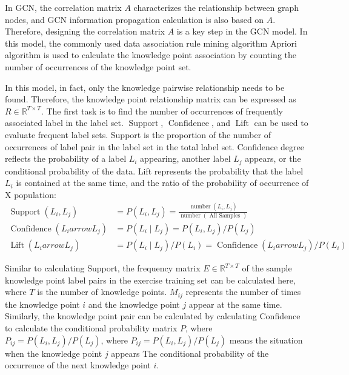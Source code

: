 In GCN, the correlation matrix \(A\) characterizes the relationship between graph nodes, and GCN information propagation calculation is also based on \(A\). Therefore, designing the correlation matrix \(A\) is a key step in the GCN model. In this model, the commonly used data association rule mining algorithm Apriori algorithm is used to calculate the knowledge point association by counting the number of occurrences of the knowledge point set.

In this model, in fact, only the knowledge pairwise relationship needs to be found. Therefore, the knowledge point relationship matrix can be expressed as \(R\in \mathbb{R}^{T\times T}\). The first task is to find the number of occurrences of frequently associated label in the label set. \(\operatorname{Support}\), \(\operatorname{Confidence}\), and \(\operatorname{Lift}\) can be used to evaluate frequent label sets. Support is the proportion of the number of occurrences of label pair in the label set in the total label set. Confidence degree reflects the probability of a label \(L_i\) appearing, another label \(L_j\) appears, or the conditional probability of the data. Lift represents the probability that the label \(L_i\) is contained at the same time, and the ratio of the probability of occurrence of X population:
\begin{align}
	\operatorname{Support}(L_i, L_j)         & =P(L_i,L_j)=\frac{\operatorname{number}(L_i,L_j)}{\operatorname{number}(\text { All Samples })} \\
	\operatorname{Confidence}(L_i arrow L_j) & =P(L_i \mid L_j)=P(L_i, L_j) / P(L_j)                                                           \\
	\operatorname{Lift}(L_i arrow L_j)       & =P(L_i \mid L_j) / P(L_i)=\operatorname{Confidence}(L_i arrow L_j) / P(L_i)
\end{align}

Similar to calculating Support, the frequency matrix \(E\in \mathbb{R}^{T\times T}\) of the sample knowledge point label pairs in the exercise training set can be calculated here, where \(T\) is the number of knowledge points. \(M_{ij}\) represents the number of times the knowledge point \(i\) and the knowledge point \(j\) appear at the same time. Similarly, the knowledge point pair can be calculated by calculating Confidence to calculate the conditional probability matrix \(P\), where \(P_{ij}=P(L_i, L_j)/P(L_j)\), where \(P_{ij}=P(L_i, L_j)/P(L_j)\) means the situation when the knowledge point \(j\) appears The conditional probability of the occurrence of the next knowledge point \(i\).

